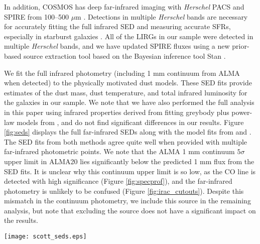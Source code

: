 \documentclass[a4paper,fleqn,usenatbib]{mnras}
\begin{document}
In addition, COSMOS has deep far-infrared imaging with {\em Herschel} PACS and SPIRE from 100--500 $\mu$m \citep{2013ApJ...778..131L}. Detections in multiple {\em Herschel} bands are necessary for accurately fitting the full infrared SED and measuring accurate SFRs, especially in starburst galaxies \citep{2015ApJ...801...80L}. All of the LIRGs in our sample were detected in multiple {\em Herschel} bands, and we have updated SPIRE fluxes using a new prior-based source extraction tool based on the Bayesian inference tool Stan \citep[XID$+$;][]{2017MNRAS.464..885H}.

We fit the full infrared photometry (including 1 mm continuum from ALMA when detected) to the physically motivated \citet{2007ApJ...657..810D} dust models. These SED fits provide estimates of the dust mass, dust temperature, and total infrared luminosity for the galaxies in our sample. We note that we have also performed the full analysis in this paper using infrared properties derived from fitting greybody plus power-law models from \citet{2012MNRAS.425.3094C}, and do not find significant differences in our results. Figure \ref{fig:seds} displays the full far-infrared SEDs along with the model fits from \citet{2007ApJ...657..810D} and \citet{2012MNRAS.425.3094C}.  The SED fits from both methods agree quite well when provided with multiple far-infrared photometric points. We note that the ALMA 1 mm continuum $5\sigma$ upper limit in ALMA20 lies significantly below the predicted 1 mm flux from the SED fits.  It is unclear why this continuum upper limit is so low, as the CO line is detected with high significance (Figure \ref{fig:specprof}), and the far-infrared photometry is unlikely to be confused  (Figure \ref{fig:irac_cutouts}). Despite this mismatch in the continuum photometry, we include this source in the remaining analysis, but note that excluding the source does not have a significant impact on the results.  %


\begin{figure*}
\centering
\texttt{[image: scott\_seds.eps]} 
\caption{Infrared Spectral Energy Distributions (SEDs) of the galaxies in our sample. Circles represent the observed flux densities from {\em Spitzer} (blue; 24 $\mu$m and 70 $\mu$m), {\em Herschel} PACS (green; 100 $\mu$m and 160 $\mu$m), ({\em Herschel} SPIRE (red; 250 $\mu$m, 350 $\mu$m, and 500 $\mu$m), and ALMA (purple; 1 mm).  All observed flux densities also have error bars plotted in black, although many of these error bars are smaller than the size of the plotted circles and are not visible.  Sources without a detection at ALMA 1 mm have 5$\sigma$ upper limits plotted as downward arrows. Solid lines represent the best fit SEDs from fitting to \citet{2007ApJ...657..810D} dust models (black) and \citet{2012MNRAS.425.3094C}  greybody plus power-law models (gray). }
\label{fig:seds}
\end{figure*} 
\end{document}
